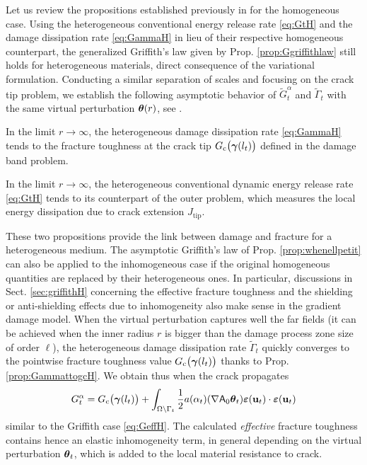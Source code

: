 Let us review the propositions established previously in \cite{LiMarigo:2015} for the homogeneous case. Using the heterogeneous conventional energy release rate \eqref{eq:GtH} and the damage dissipation rate \eqref{eq:GammaH} in lieu of their respective homogeneous counterpart, the generalized Griffith's law given by Prop. \ref{prop:Ggriffithlaw} still holds for heterogeneous materials, direct consequence of the variational formulation. Conducting a similar separation of scales and focusing on the crack tip problem, we establish the following asymptotic behavior of $\widetilde{G}_t^\alpha$ and $\widetilde{\Gamma}_t$ with the same virtual perturbation $\vtheta(r)$, see \cite{LiMarigo:2015}.
\begin{proposition} \label{prop:GammattogcH}
In the limit $r\to\infty$, the heterogeneous damage dissipation rate \eqref{eq:GammaH} tends to the fracture toughness at the crack tip $\gc\bigl(\vec{\gamma}(l_t)\bigr)$ defined in the damage band problem.
\end{proposition}
\begin{proposition} \label{prop:GalphatoGH}
In the limit $r\to\infty$, the heterogeneous conventional dynamic energy release rate \eqref{eq:GtH} tends to its counterpart of the outer problem, which measures the local energy dissipation due to crack extension $J_\mathrm{tip}$.
\end{proposition}
These two propositions provide the link between damage and fracture for a heterogeneous medium. The asymptotic Griffith's law of Prop. \ref{prop:whenellpetit} can also be applied to the inhomogeneous case if the original homogeneous quantities are replaced by their heterogeneous ones. In particular, discussions in Sect. \ref{sec:griffithH} concerning the effective fracture toughness and the shielding or anti-shielding effects due to inhomogeneity also make sense in the gradient damage model. When the virtual perturbation captures well the far fields (it can be achieved when the inner radius $r$ is bigger than the damage process zone size of order $\ell$), the heterogeneous damage dissipation rate $\widetilde{\Gamma}_t$ quickly converges to the pointwise fracture toughness value $\gc\bigl(\vec{\gamma}(l_t)\bigr)$ thanks to Prop. \ref{prop:GammattogcH}. We obtain thus when the crack propagates
\begin{equation} \label{eq:GtalphaH}
G_t^\alpha=\gc\bigl(\vec{\gamma}(l_t)\bigr)+\int_\domaint\frac{1}{2}a(\alpha_t)(\nabla\tens{A}_0\vtheta_t)\eps(\vec{u}_t)\cdot\eps(\vec{u}_t)
\end{equation}
similar to the Griffith case \eqref{eq:GeffH}. The calculated \emph{effective} fracture toughness contains hence an elastic inhomogeneity term, in general depending on the virtual perturbation $\vtheta_t$, which is added to the local material resistance to crack.

